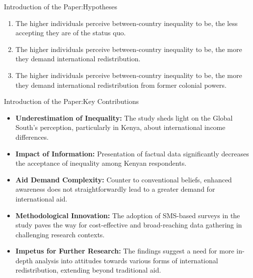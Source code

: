 \documentclass[aspectratio=169,10pt,compress]{beamer}
\begin{document}
\begin{frame}{Introduction of the Paper:Hypotheses}
  \begin{enumerate}
    \item The higher individuals perceive between-country inequality to be, the less accepting they are of the status quo.
    \item The higher individuals perceive between-country inequality to be, the more they demand international redistribution.
    \item The higher individuals perceive between-country inequality to be, the more they demand international redistribution from former colonial powers.
  \end{enumerate}
\end{frame}
\begin{frame}{Introduction of the Paper:Key Contributions}
  \begin{itemize}
    \item \textbf{Underestimation of Inequality:} The study sheds light on the Global South's perception, particularly in Kenya, about international income differences.
    \item \textbf{Impact of Information:} Presentation of factual data significantly decreases the acceptance of inequality among Kenyan respondents.
    \item \textbf{Aid Demand Complexity:} Counter to conventional beliefs, enhanced awareness does not straightforwardly lead to a greater demand for international aid.
    \item \textbf{Methodological Innovation:} The adoption of SMS-based surveys in the study paves the way for cost-effective and broad-reaching data gathering in challenging research contexts.
    \item \textbf{Impetus for Further Research:} The findings suggest a need for more in-depth analysis into attitudes towards various forms of international redistribution, extending beyond traditional aid.
  \end{itemize}
\end{frame}
\end{document}
